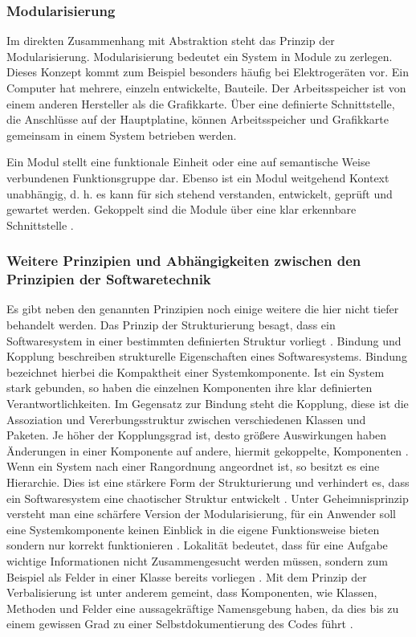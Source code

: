 \documentclass[12pt,oneside,a4paper,parskip]{scrbook}
\begin{document}
\subsubsection{Modularisierung}

Im direkten Zusammenhang mit Abstraktion steht das Prinzip der Modularisierung. Modularisierung bedeutet ein System in Module zu zerlegen. Dieses Konzept kommt zum Beispiel besonders häufig bei Elektrogeräten vor. Ein Computer hat mehrere, einzeln entwickelte, Bauteile. Der Arbeitsspeicher ist von einem anderen Hersteller als die Grafikkarte. Über eine definierte Schnittstelle, die Anschlüsse auf der Hauptplatine, können Arbeitsspeicher und Grafikkarte gemeinsam in einem System betrieben werden.

Ein Modul stellt eine funktionale Einheit oder eine auf semantische Weise verbundenen Funktionsgruppe dar. Ebenso ist ein Modul weitgehend Kontext unabhängig, d. h. es kann für sich stehend verstanden, entwickelt, geprüft und gewartet werden. Gekoppelt sind die Module über eine klar erkennbare Schnittstelle \cite[S. 41]{balzert2009a}.

\subsubsection{Weitere Prinzipien und Abhängigkeiten zwischen den Prinzipien der Softwaretechnik}

Es gibt neben den genannten Prinzipien noch einige weitere die hier nicht tiefer behandelt werden. Das Prinzip der Strukturierung besagt, dass ein Softwaresystem in einer bestimmten definierten Struktur vorliegt \cite[S. 34ff.]{balzert2009a}. Bindung und Kopplung beschreiben strukturelle Eigenschaften eines Softwaresystems. Bindung bezeichnet hierbei die Kompaktheit einer Systemkomponente. Ist ein System stark gebunden, so haben die einzelnen Komponenten ihre klar definierten Verantwortlichkeiten. Im Gegensatz zur Bindung steht die Kopplung, diese ist die Assoziation und Vererbungsstruktur zwischen verschiedenen Klassen und Paketen. Je höher der Kopplungsgrad ist, desto größere Auswirkungen haben Änderungen in einer Komponente auf andere, hiermit gekoppelte, Komponenten \cite[S. 37f.]{balzert2009a}. Wenn ein System nach einer Rangordnung angeordnet ist, so besitzt es eine Hierarchie. Dies ist eine stärkere Form der Strukturierung und verhindert es, dass ein Softwaresystem eine chaotischer Struktur entwickelt \cite[S. 39ff.]{balzert2009a}. Unter Geheimnisprinzip versteht man eine schärfere Version der Modularisierung, für ein Anwender soll eine Systemkomponente keinen Einblick in die eigene Funktionsweise bieten sondern nur korrekt funktionieren \cite[S. 42ff.]{balzert2009a}. Lokalität bedeutet, dass für eine Aufgabe wichtige Informationen nicht Zusammengesucht werden müssen, sondern zum Beispiel als Felder in einer Klasse bereits vorliegen \cite[S. 45f.]{balzert2009a}. Mit dem Prinzip der Verbalisierung ist unter anderem gemeint, dass Komponenten, wie Klassen, Methoden und Felder eine aussagekräftige Namensgebung haben, da dies bis zu einem gewissen Grad zu einer Selbstdokumentierung des Codes führt \cite[S. 46ff.]{balzert2009a}.
\end{document}
